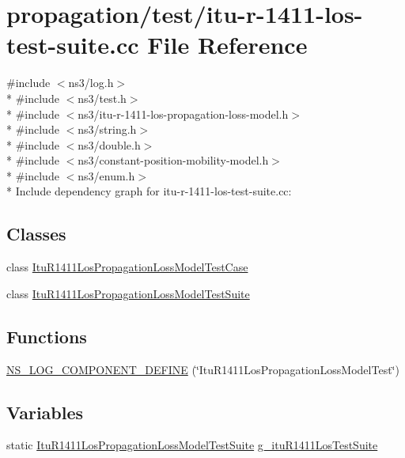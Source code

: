 \hypertarget{itu-r-1411-los-test-suite_8cc}{}\section{propagation/test/itu-\/r-\/1411-\/los-\/test-\/suite.cc File Reference}
\label{itu-r-1411-los-test-suite_8cc}
{\ttfamily \#include $<$ns3/log.\+h$>$}\\*
{\ttfamily \#include $<$ns3/test.\+h$>$}\\*
{\ttfamily \#include $<$ns3/itu-\/r-\/1411-\/los-\/propagation-\/loss-\/model.\+h$>$}\\*
{\ttfamily \#include $<$ns3/string.\+h$>$}\\*
{\ttfamily \#include $<$ns3/double.\+h$>$}\\*
{\ttfamily \#include $<$ns3/constant-\/position-\/mobility-\/model.\+h$>$}\\*
{\ttfamily \#include $<$ns3/enum.\+h$>$}\\*
Include dependency graph for itu-\/r-\/1411-\/los-\/test-\/suite.cc\+:
\subsection*{Classes}
\begin{DoxyCompactItemize}
\item 
class \hyperlink{classItuR1411LosPropagationLossModelTestCase}{Itu\+R1411\+Los\+Propagation\+Loss\+Model\+Test\+Case}
\item 
class \hyperlink{classItuR1411LosPropagationLossModelTestSuite}{Itu\+R1411\+Los\+Propagation\+Loss\+Model\+Test\+Suite}
\end{DoxyCompactItemize}
\subsection*{Functions}
\begin{DoxyCompactItemize}
\item 
\hyperlink{itu-r-1411-los-test-suite_8cc_a658b30a2eceb40180d6095dd3c295c11}{N\+S\+\_\+\+L\+O\+G\+\_\+\+C\+O\+M\+P\+O\+N\+E\+N\+T\+\_\+\+D\+E\+F\+I\+NE} (\char`\"{}Itu\+R1411\+Los\+Propagation\+Loss\+Model\+Test\char`\"{})
\end{DoxyCompactItemize}
\subsection*{Variables}
\begin{DoxyCompactItemize}
\item 
static \hyperlink{classItuR1411LosPropagationLossModelTestSuite}{Itu\+R1411\+Los\+Propagation\+Loss\+Model\+Test\+Suite} \hyperlink{itu-r-1411-los-test-suite_8cc_ac4bf3bc4647b544b2eaad38f14e4095d}{g\+\_\+itu\+R1411\+Los\+Test\+Suite}
\end{DoxyCompactItemize}


